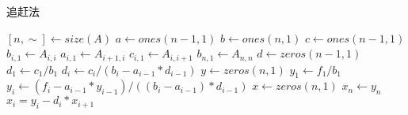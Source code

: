 \begin{breakablealgorithm}
    \caption{追赶法}
    \begin{algorithmic}[1]
        \STATE $[n, \sim] \leftarrow size(A)$ 
        \STATE $a \leftarrow ones(n - 1, 1)$  
        \STATE $b \leftarrow ones(n, 1)$ 
        \STATE $c \leftarrow ones(n - 1, 1)$
        \STATE $b_{i, 1} \leftarrow A_{i, i}$
        \STATE $a_{i, 1} \leftarrow A_{i + 1, i}$
        \STATE $c_{i, 1} \leftarrow A_{i, i + 1}$
        \ENDFOR
        \STATE $b_{n, 1} \leftarrow A_{n, n}$
        \STATE $d \leftarrow zeros(n - 1, 1)$ 
        \STATE $d_1 \leftarrow c_1 / b_1$
        \STATE $d_i \leftarrow c_i / (b_i - a_{i - 1} * d_{i - 1})$
        \ENDFOR
        \STATE $y \leftarrow zeros(n, 1)$ 
        \STATE $y_1 \leftarrow f_1 / b_1$
        \STATE $y_i \leftarrow (f_i - a_{i - 1} * y_{i - 1}) / ((b_i - a_{i - 1}) * d_{i - 1})$
        \STATE $x \leftarrow zeros(n, 1)$ 
        \STATE $x_n \leftarrow y_n$
        \ENDFOR
        \STATE $x_i = y_i - d_i * x_{i + 1}$
        \ENDFOR
    \end{algorithmic}
\end{breakablealgorithm}
